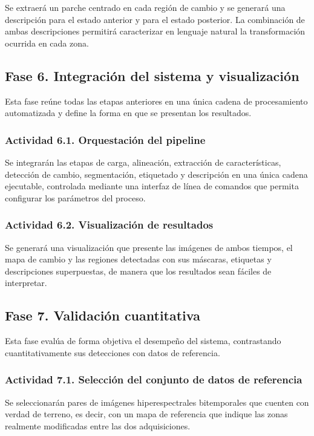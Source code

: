 \documentclass[12pt,onecolumn]{IEEEtran}
\begin{document}
Se extraerá un parche centrado en cada región de cambio y se generará una descripción para el estado anterior y para el estado posterior. La combinación de ambas descripciones permitirá caracterizar en lenguaje natural la transformación ocurrida en cada zona.

\subsection{{Fase 6. Integración del sistema y visualización}}
Esta fase reúne todas las etapas anteriores en una única cadena de procesamiento automatizada y define la forma en que se presentan los resultados.

\subsubsection{{Actividad 6.1. Orquestación del pipeline}}

Se integrarán las etapas de carga, alineación, extracción de características, detección de cambio, segmentación, etiquetado y descripción en una única cadena ejecutable, controlada mediante una interfaz de línea de comandos que permita configurar los parámetros del proceso.

\subsubsection{{Actividad 6.2. Visualización de resultados}}

Se generará una visualización que presente las imágenes de ambos tiempos, el mapa de cambio y las regiones detectadas con sus máscaras, etiquetas y descripciones superpuestas, de manera que los resultados sean fáciles de interpretar.

\subsection{{Fase 7. Validación cuantitativa}}
Esta fase evalúa de forma objetiva el desempeño del sistema, contrastando cuantitativamente sus detecciones con datos de referencia.

\subsubsection{{Actividad 7.1. Selección del conjunto de datos de referencia}}

Se seleccionarán pares de imágenes hiperespectrales bitemporales que cuenten con verdad de terreno, es decir, con un mapa de referencia que indique las zonas realmente modificadas entre las dos adquisiciones.
\end{document}
